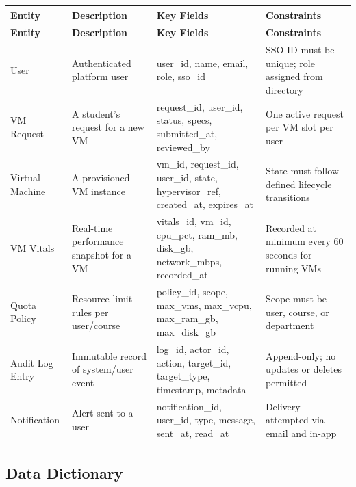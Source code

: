 \documentclass[12pt,letterpaper]{article}
\begin{document}
\begin{longtable}{L{2.8cm} L{3.5cm} L{4cm} L{4cm}}
  \toprule
  \textbf{Entity} & \textbf{Description} & \textbf{Key Fields} & \textbf{Constraints} \\
  \midrule
  \endfirsthead
  \toprule
  \textbf{Entity} & \textbf{Description} & \textbf{Key Fields} & \textbf{Constraints} \\
  \midrule
  \endhead
  \bottomrule
  \endfoot

  User & Authenticated platform user & user\_id, name, email, role, sso\_id & SSO ID must be unique; role assigned from directory \\
  \addlinespace
  VM Request & A student's request for a new VM & request\_id, user\_id, status, specs, submitted\_at, reviewed\_by & One active request per VM slot per user \\
  \addlinespace
  Virtual Machine & A provisioned VM instance & vm\_id, request\_id, user\_id, state, hypervisor\_ref, created\_at, expires\_at & State must follow defined lifecycle transitions \\
  \addlinespace
  VM Vitals & Real-time performance snapshot for a VM & vitals\_id, vm\_id, cpu\_pct, ram\_mb, disk\_gb, network\_mbps, recorded\_at & Recorded at minimum every 60 seconds for running VMs \\
  \addlinespace
  Quota Policy & Resource limit rules per user/course & policy\_id, scope, max\_vms, max\_vcpu, max\_ram\_gb, max\_disk\_gb & Scope must be user, course, or department \\
  \addlinespace
  Audit Log Entry & Immutable record of system/user event & log\_id, actor\_id, action, target\_id, target\_type, timestamp, metadata & Append-only; no updates or deletes permitted \\
  \addlinespace
  Notification & Alert sent to a user & notification\_id, user\_id, type, message, sent\_at, read\_at & Delivery attempted via email and in-app \\
\end{longtable}

\subsection{Data Dictionary}
\end{document}
